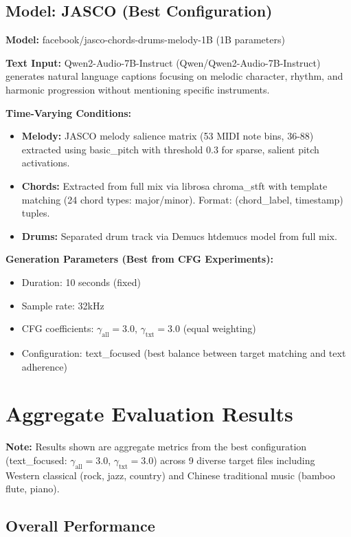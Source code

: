 \documentclass{article}
\begin{document}
\begin{CJK}{UTF8}{bsmi}
\subsection{Model: JASCO (Best Configuration)}

\textbf{Model:} facebook/jasco-chords-drums-melody-1B (1B parameters)

\textbf{Text Input:} Qwen2-Audio-7B-Instruct (Qwen/Qwen2-Audio-7B-Instruct) generates natural language captions focusing on melodic character, rhythm, and harmonic progression without mentioning specific instruments.

\textbf{Time-Varying Conditions:}
\begin{itemize}
    \item \textbf{Melody:} JASCO melody salience matrix (53 MIDI note bins, 36-88) extracted using basic\_pitch with threshold 0.3 for sparse, salient pitch activations.
    \item \textbf{Chords:} Extracted from full mix via librosa chroma\_stft with template matching (24 chord types: major/minor). Format: (chord\_label, timestamp) tuples.
    \item \textbf{Drums:} Separated drum track via Demucs htdemucs model from full mix.
\end{itemize}

\textbf{Generation Parameters (Best from CFG Experiments):}
\begin{itemize}
    \item Duration: 10 seconds (fixed)
    \item Sample rate: 32kHz
    \item CFG coefficients: $\gamma_{\text{all}}=3.0$, $\gamma_{\text{txt}}=3.0$ (equal weighting)
    \item Configuration: text\_focused (best balance between target matching and text adherence)
\end{itemize}

\section{Aggregate Evaluation Results}

\textbf{Note:} Results shown are aggregate metrics from the best configuration (text\_focused: $\gamma_{\text{all}}=3.0$, $\gamma_{\text{txt}}=3.0$) across 9 diverse target files including Western classical (rock, jazz, country) and Chinese traditional music (bamboo flute, piano).

\subsection{Overall Performance}


\end{CJK}
\end{document}
